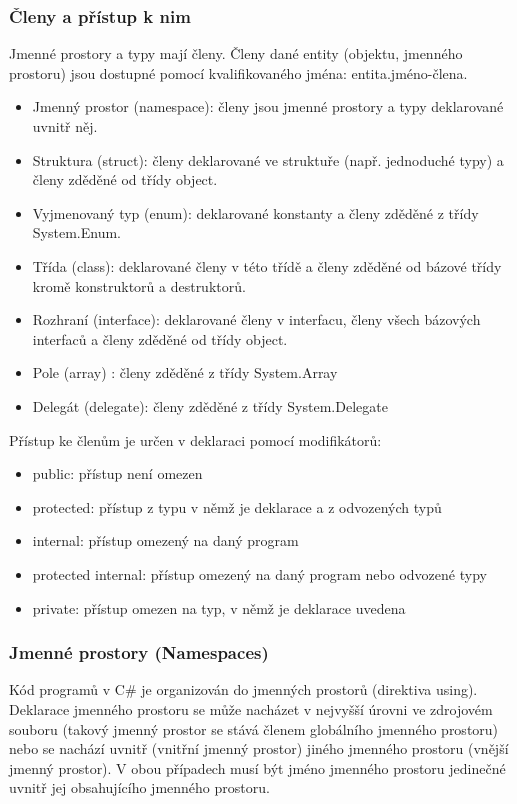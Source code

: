 \subsubsection*{Členy a přístup k nim}
Jmenné prostory a typy mají členy. Členy dané entity (objektu, jmenného prostoru) jsou dostupné pomocí kvalifikovaného jména: entita.jméno-člena.
\begin{itemize}
\item Jmenný prostor (namespace): členy jsou jmenné prostory a typy deklarované uvnitř něj.
\item Struktura (struct): členy deklarované ve struktuře (např. jednoduché typy) a členy zděděné od třídy object.
\item Vyjmenovaný typ (enum): deklarované konstanty a členy zděděné z třídy System.Enum.
\item Třída (class): deklarované členy v této třídě a členy zděděné od bázové třídy kromě konstruktorů a destruktorů.
\item Rozhraní (interface): deklarované členy v interfacu, členy všech bázových interfaců a členy zděděné od třídy object.
\item Pole (array) : členy zděděné z třídy System.Array
\item Delegát (delegate): členy zděděné z třídy System.Delegate
\end{itemize}
Přístup ke členům je určen v deklaraci pomocí modifikátorů:
\begin{itemize}
\item public: přístup není omezen
\item protected: přístup z typu v němž je deklarace a z odvozených typů
\item internal: přístup omezený na daný program
\item protected internal: přístup omezený na daný program nebo odvozené typy
\item private: přístup omezen na typ, v němž je deklarace uvedena
\end{itemize}

\subsubsection*{Jmenné prostory (Namespaces)}
Kód programů v C\# je organizován do jmenných prostorů (direktiva using). Deklarace jmenného prostoru se může nacházet v nejvyšší úrovni ve zdrojovém souboru (takový jmenný prostor se stává členem globálního jmenného prostoru) nebo se nachází uvnitř (vnitřní jmenný prostor) jiného jmenného prostoru (vnější jmenný prostor). V obou případech musí být jméno jmenného prostoru jedinečné uvnitř jej obsahujícího jmenného prostoru.


